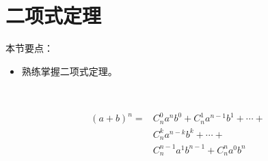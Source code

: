\section{二项式定理}

本节要点：
\begin{itemize}
    \item 熟练掌握二项式定理。
\end{itemize}

~

\begin{align*}
\left( a+b \right) ^n=&C_{n}^{0}a^nb^0+C_{n}^{1}a^{n-1}b^1+\cdots + \\
&C_{n}^{k}a^{n-k}b^k+\cdots + \\
&C_{n}^{n-1}a^1b^{n-1}+C_{n}^{n}a^0b^n
\end{align*}




